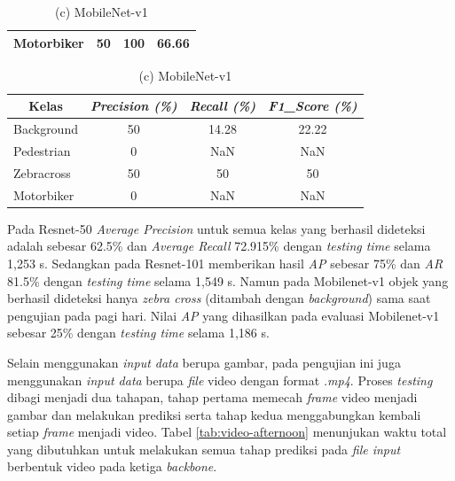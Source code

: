 \begin{table}[!h]
\begin{minipage}[b]{\textwidth}
\begin{tabular}{|l|c|c|c|}
			Motorbiker                           & 50                               & 100                           & 66.66                            \\ \hline
		\end{tabular}
	\end{minipage}
	\vfill
	\begin{minipage}[b]{\textwidth}
		\centering
		\caption*{(c) MobileNet-v1}
		\begin{tabular}{|l|c|c|c|}
			\hline
			\multicolumn{1}{|c|}{\textbf{Kelas}} & \textit{\textbf{Precision (\%)}} & \textit{\textbf{Recall (\%)}} & \textit{\textbf{F1\_Score (\%)}} \\ \hline
			Background                           & 50                               & 14.28                         & 22.22                            \\ \hline
			Pedestrian                           & 0                                & NaN                           & NaN                              \\ \hline
			Zebracross                           & 50                               & 50                            & 50                               \\ \hline
			Motorbiker                           & 0                                & NaN                           & NaN                              \\ \hline
		\end{tabular}
	\end{minipage}
	\label{tab:evaluate-afternoon}
\end{table}

Pada Resnet-50 \textit{Average Precision} untuk semua kelas yang berhasil dideteksi adalah sebesar 62.5\% dan \textit{Average Recall} 72.915\% dengan \textit{testing time} selama 1,253 s. Sedangkan pada Resnet-101 memberikan hasil \textit{AP} sebesar 75\% dan \textit{AR} 81.5\% dengan \textit{testing time} selama 1,549 s. Namun pada Mobilenet-v1 objek yang berhasil dideteksi hanya \textit{zebra cross} (ditambah dengan \textit{background}) sama saat pengujian pada pagi hari. Nilai \textit{AP} yang dihasilkan pada evaluasi Mobilenet-v1 sebesar 25\% dengan \textit{testing time} selama 1,186 s.

Selain menggunakan \textit{input data} berupa gambar, pada pengujian ini juga menggunakan \textit{input data} berupa \textit{file} video dengan format \textit{.mp4}. Proses \textit{testing} dibagi menjadi dua tahapan, tahap pertama memecah \textit{frame} video menjadi gambar dan melakukan prediksi serta tahap kedua menggabungkan kembali setiap \textit{frame} menjadi video. Tabel \ref{tab:video-afternoon} menunjukan waktu total yang dibutuhkan untuk melakukan semua tahap prediksi pada \textit{file input} berbentuk video pada ketiga \textit{backbone}.

